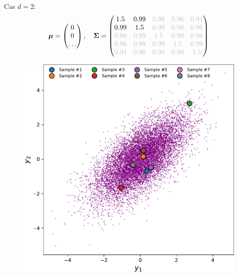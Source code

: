 \documentclass[xcolor=svgnames, t]{beamer}
\newcommand{\vectorx}[1]{\boldsymbol{\MakeLowercase{\mathbf{#1}}}}
\newcommand{\matrixx}[1]{\boldsymbol{\MakeUppercase{#1}}}
\begin{document}
\begin{frame}
  Cas $d=2$:
  \begin{equation*}
    \vectorx{\mu}
    =
    \begin{pmatrix}
      0 \\
      0 \\
      \dots
    \end{pmatrix},
    \quad
    \matrixx{\Sigma}
    =
    \begin{pmatrix}
      1.5 & 0.99 & \color{lightgray}0.98 & \color{lightgray}0.96 & \color{lightgray}0.94 \\
      0.99 & 1.5 & \color{lightgray}0.99 & \color{lightgray}0.98 & \color{lightgray}0.96 \\
      \color{lightgray}0.98 & \color{lightgray}0.99 & \color{lightgray}1.5 & \color{lightgray}0.99 & \color{lightgray}0.98 \\
      \color{lightgray}0.96 & \color{lightgray}0.98 & \color{lightgray}0.99 & \color{lightgray}1.5 & \color{lightgray}0.99 \\
      \color{lightgray}0.94 & \color{lightgray}0.96 & \color{lightgray}0.98 & \color{lightgray}0.99 & \color{lightgray}1.5
      \end{pmatrix}
  \end{equation*}
  \begin{figure}[ht]
    \includegraphics[scale=0.3]{gaussian_2d_2outof5.pdf}

\end{figure}
\end{frame}
\end{document}
